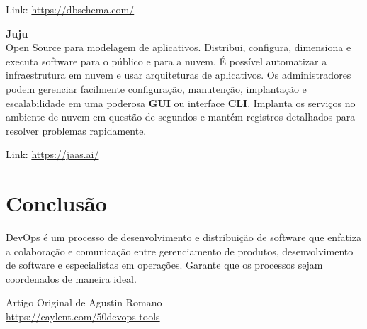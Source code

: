 \documentclass[fleqn,10pt]{SelfArx} %
\begin{document}
Link: \url{https://dbschema.com/}

\textbf{Juju} \\
Open Source para modelagem de aplicativos. Distribui, configura, dimensiona e executa software para o público e para a nuvem. É possível automatizar a infraestrutura em nuvem e usar arquiteturas de aplicativos. Os administradores podem gerenciar facilmente configuração, manutenção, implantação e escalabilidade em uma poderosa \textbf{GUI} ou interface \textbf{CLI}. Implanta os serviços no ambiente de nuvem em questão de segundos e mantém registros detalhados para resolver problemas rapidamente.

Link: \url{https://jaas.ai/}

\section*{Conclusão}

DevOps é um processo de desenvolvimento e distribuição de software que enfatiza a colaboração e comunicação entre gerenciamento de produtos, desenvolvimento de software e especialistas em operações. Garante que os processos sejam coordenados de maneira ideal.



\begin{thebibliography}{4}
	Artigo Original de Agustin Romano \\
	\url{https://caylent.com/50devops-tools}
	
	
\end{thebibliography}
\end{document}
